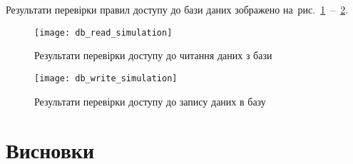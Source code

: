\documentclass[../main.tex]{subfiles}
\begin{document}
Результати перевірки правил доступу до бази даних зображено на~рис.~\ref{figure:db_read_simulation}~--~\ref{figure:db_write_simulation}.

\begin{figure}[H]
	\centering
	\texttt{[image: db\_read\_simulation]}
	\caption{Результати перевірки доступу до читання даних з бази}
	\label{figure:db_read_simulation}
\end{figure}

\begin{figure}[H]
	\centering
	\texttt{[image: db\_write\_simulation]}
	\caption{Результати перевірки доступу до запису даних в базу}
	\label{figure:db_write_simulation}
\end{figure}

\section{Висновки}

	
\end{document}
